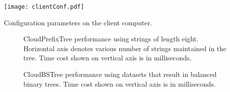 \documentclass[10pt, conference, compsocconf]{IEEEtran}
\begin{document}
\begin{table}[t]
\begin{center}
\texttt{[image: clientConf.pdf]}
\caption{Configuration parameters on the client computer. }
\label{fig:config}
\end{center}
\end{table}



\begin{figure}[t]
\centering
{}
   \hspace{-1\baselineskip}
    \hspace{-1\baselineskip}
   \label{fig:trie8}
 \caption[Optional caption for list of figures]{CloudPrefixTree performance using strings of length eight.
  Horizontal axis denotes various number of strings maintained in the tree. Time cost shown on vertical axis is in milliseconds.
}
\label{fig:trie8}
\end{figure}


\begin{figure}[t]
\centering
{}
   \hspace{-1\baselineskip}
    \hspace{-1\baselineskip}
   \label{fig:bst}
 \caption[Optional caption for list of figures]{CloudBSTree performance using datasets that result in balanced binary trees.
 Time cost shown on vertical axis is in milliseconds.
 }
\label{fig:bst}
\end{figure}
\end{document}
